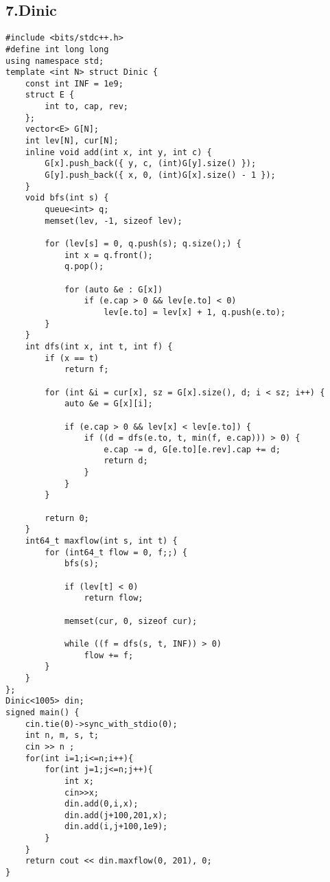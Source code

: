 \documentclass[]{article}
\begin{document}
\hypertarget{dinic}{%
\subsection{7.Dinic}\label{dinic}}

\begin{verbatim}
#include <bits/stdc++.h>
#define int long long
using namespace std;
template <int N> struct Dinic {
    const int INF = 1e9;
    struct E {
        int to, cap, rev;
    };
    vector<E> G[N];
    int lev[N], cur[N];
    inline void add(int x, int y, int c) {
        G[x].push_back({ y, c, (int)G[y].size() });
        G[y].push_back({ x, 0, (int)G[x].size() - 1 });
    }
    void bfs(int s) {
        queue<int> q;
        memset(lev, -1, sizeof lev);

        for (lev[s] = 0, q.push(s); q.size();) {
            int x = q.front();
            q.pop();

            for (auto &e : G[x])
                if (e.cap > 0 && lev[e.to] < 0)
                    lev[e.to] = lev[x] + 1, q.push(e.to);
        }
    }
    int dfs(int x, int t, int f) {
        if (x == t)
            return f;

        for (int &i = cur[x], sz = G[x].size(), d; i < sz; i++) {
            auto &e = G[x][i];

            if (e.cap > 0 && lev[x] < lev[e.to]) {
                if ((d = dfs(e.to, t, min(f, e.cap))) > 0) {
                    e.cap -= d, G[e.to][e.rev].cap += d;
                    return d;
                }
            }
        }

        return 0;
    }
    int64_t maxflow(int s, int t) {
        for (int64_t flow = 0, f;;) {
            bfs(s);

            if (lev[t] < 0)
                return flow;

            memset(cur, 0, sizeof cur);

            while ((f = dfs(s, t, INF)) > 0)
                flow += f;
        }
    }
};
Dinic<1005> din;
signed main() {
    cin.tie(0)->sync_with_stdio(0);
    int n, m, s, t;
    cin >> n ;
    for(int i=1;i<=n;i++){
        for(int j=1;j<=n;j++){
            int x;
            cin>>x;
            din.add(0,i,x);
            din.add(j+100,201,x);
            din.add(i,j+100,1e9);
        }
    }
    return cout << din.maxflow(0, 201), 0;
}
\end{verbatim}
\end{document}
